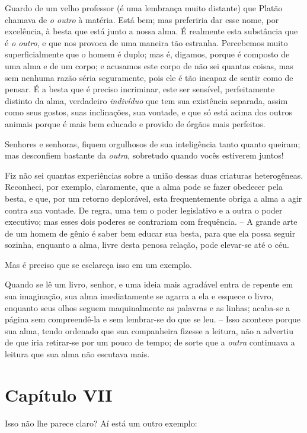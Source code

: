  Guardo de um velho professor (é uma lembrança muito distante) que
Platão chamava de \textit{o outro} à matéria. Está bem; mas preferiria
dar esse nome, por excelência, à besta que está junto a nossa alma. É
realmente esta substância que é \textit{o outro}, e que nos provoca de
uma maneira tão estranha. Percebemos muito superficialmente que o homem
é duplo; mas é, digamos, porque é composto de uma alma e de um corpo; e
acusamos este corpo de não sei quantas coisas, mas sem nenhuma razão
séria seguramente, pois ele é tão incapaz de sentir como de pensar. É a
besta que é preciso incriminar, este ser sensível, perfeitamente
distinto da alma, verdadeiro \textit{indivíduo} que tem sua existência
separada, assim como seus gostos, suas inclinações, sua vontade, e que
só está acima dos outros animais porque é mais bem educado e provido de
órgãos mais perfeitos.

 Senhores e senhoras, fiquem orgulhosos de sua inteligência tanto quanto
queiram; mas desconfiem bastante da\textit{ outra}, sobretudo quando
vocês estiverem juntos!

 Fiz não sei quantas experiências sobre a união dessas duas criaturas
heterogêneas. Reconheci, por exemplo, claramente, que a alma pode se
fazer obedecer pela besta, e que, por um retorno deplorável, esta
frequentemente obriga a alma a agir contra sua vontade. De regra, uma
tem o poder legislativo e a outra o poder executivo; mas esses dois
poderes se contrariam com frequência. -- A grande arte de um homem de
gênio é saber bem educar sua besta, para que ela possa seguir sozinha,
enquanto a alma, livre desta penosa relação, pode elevar-se até o céu. 

 Mas é preciso que se esclareça isso em um exemplo.

 Quando se lê um livro, senhor, e uma ideia mais agradável entra de
repente em sua imaginação, sua alma imediatamente se agarra a ela e
esquece o livro, enquanto seus olhos seguem maquinalmente as palavras e
as linhas; acaba-se a página sem compreendê-la e sem lembrar-se do que
se leu. -- Isso acontece porque sua alma, tendo ordenado que sua
companheira fizesse a leitura, não a advertiu de que iria retirar-se
por um pouco de tempo; de sorte que a \textit{outra} continuava a
leitura que sua alma não escutava mais.

\section{Capítulo VII}

 Isso não lhe parece claro? Aí está um outro exemplo:

